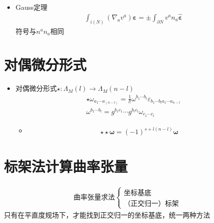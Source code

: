 \begin{itemize}
    $\partial N$有归一化外向法矢$n^a$，诱导度规$h_{ab}$，诱导体元$\hat{\varepsilon}_{a_1 \cdots a_{n-1}}$满足
    \begin{enumerate}
        \item 与$\partial N$上的诱导定向$\bar{\varepsilon}_{a_1 \cdots a_{n-1}}$相容
        \item 与度规$h_{ab}$相容
    \end{enumerate}
    \begin{gather*}
        \hat{\varepsilon}_{a_1 \cdots a_{n-1}}=n^b \varepsilon_{ba_1 \cdots a_{n-1}}
    \end{gather*}
    \item Gauss定理
    \begin{gather*}
        \int_{i(N)} (\nabla_a v^a) \bm{\varepsilon}=\pm \int_{\partial N} v^a n_a \hat{\bm{\varepsilon}}
    \end{gather*}
    符号与$n^a n_a$相同
\end{itemize}

\section{对偶微分形式}

\begin{itemize}
    \item 对偶微分形式$\star:\Lambda_M(l) \to \Lambda_M(n-l)$
    \begin{gather*}
        \star \omega_{a_1 \cdots a_(n-l)}=\frac{1}{l!}\omega^{b_1 \cdots b_l} \varepsilon_{b_1 \cdots b_l a_1 \cdots a_{n-l}}
        \\
        \omega^{b_1 \cdots b_l}=g^{b_1 c_1} \cdots g^{b_l c_l} \omega_{c_1 \cdots c_l}
    \end{gather*}
    \begin{itemize}
        \item 
        \begin{gather*}
            \star \star \bm{\omega}=(-1)^{s+l(n-l)}\bm{\omega}    
        \end{gather*}
    \end{itemize}
\end{itemize}

\section{标架法计算曲率张量}

\begin{gather*}
    \text{曲率张量求法}
    \begin{cases}
        \text{坐标基底}
        \\
        \text{（正交归一）标架}
    \end{cases}
\end{gather*}
只有在平直度规场下，才能找到正交归一的坐标基底，统一两种方法

